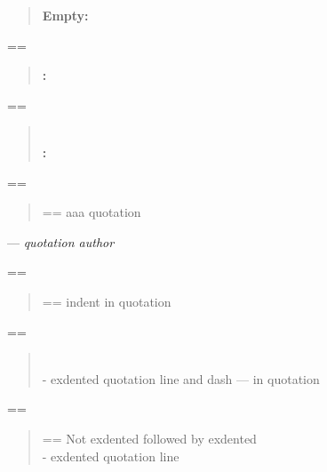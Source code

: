 \documentclass{book}
\makeatletter
\newenvironment{Texinfopreformatted}{%
  \par\GNUTobeylines\obeyspaces\frenchspacing\parskip=\z@\parindent=\z@}{}
{\catcode`\^^M=13 \gdef\GNUTobeylines{\catcode`\^^M=13 \def^^M{\null\par}}}
\newenvironment{Texinfoindented}{\begin{list}{}{}\item\relax}{\end{list}}
\renewcommand{\_}{\Texinfounderscore\discretionary{}{}{}}
\makeatother
\begin{document}
\begin{Texinfoindented}
\begin{quote}
\textbf{Empty:} \end{quote}
\begin{Texinfopreformatted}%
\ttfamily 
\end{Texinfopreformatted}
\begin{quote}
\textbf{:} \end{quote}
\begin{Texinfopreformatted}%
\ttfamily 
\end{Texinfopreformatted}
\begin{quote}
\textbf{\leavevmode{}\\:} \end{quote}
\begin{Texinfopreformatted}%
\ttfamily 
\end{Texinfopreformatted}
\begin{quote}
\begin{Texinfopreformatted}%
\ttfamily aaa quotation
\end{Texinfopreformatted}
\end{quote}
\begin{center}
--- \emph{quotation author}
\end{center}
\begin{Texinfopreformatted}%
\ttfamily 
\end{Texinfopreformatted}
\begin{quote}
\begin{Texinfopreformatted}%
\ttfamily indent in quotation
\end{Texinfopreformatted}
\end{quote}
\begin{Texinfopreformatted}%
\ttfamily 
\end{Texinfopreformatted}
\begin{quote}
\leavevmode{}\\
\hbox{\kern -\leftmargin}%
exdented quotation line   and dash --- in quotation
\\
\end{quote}
\begin{Texinfopreformatted}%
\ttfamily 
\end{Texinfopreformatted}
\begin{quote}
\begin{Texinfopreformatted}%
\ttfamily Not exdented followed by exdented
\end{Texinfopreformatted}
\leavevmode{}\\
\hbox{\kern -\leftmargin}%
exdented quotation line
\\
\end{quote}

\end{Texinfoindented}
\end{document}
